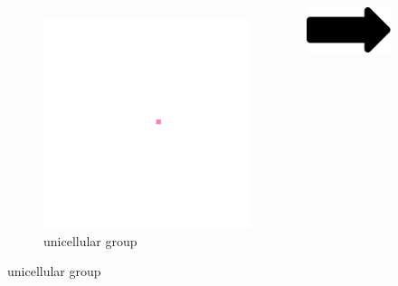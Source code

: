 \begin{figure}
  \centering
\begin{columns}
\begin{column}{0.25\textwidth}
  \begin{subfigure}[b]{\textwidth}
    \includegraphics[width=\textwidth,trim={300 300 250 250},clip]{img/lifecycle-1}
    \caption{unicellular group}
    \label{fig:lifecycle-1}
  \end{subfigure}%
\end{column}
\begin{column}{0.05\textwidth}
  \vspace{3ex}
  \includegraphics[width=\textwidth]{img/arrow}

\end{column}
\end{columns}
\end{figure}
